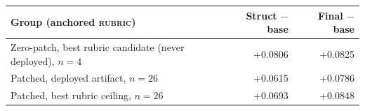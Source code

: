 \begin{tabular}{lrr}
\toprule
Group (anchored \textsc{rubric}) & Struct $-$ base & Final $-$ base \\
\midrule
Zero-patch, best rubric candidate (never deployed), $n{=}4$ & +0.0806 & +0.0825 \\
Patched, deployed artifact, $n{=}26$ & +0.0615 & +0.0786 \\
Patched, best rubric ceiling, $n{=}26$ & +0.0693 & +0.0848 \\
\bottomrule
\end{tabular}
